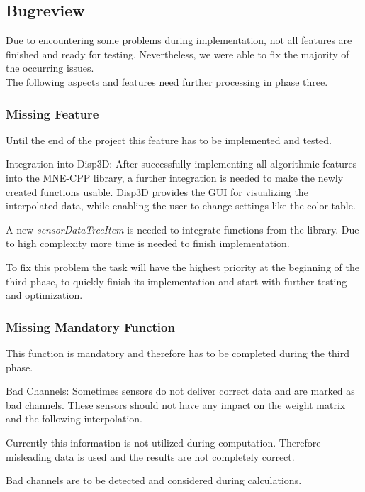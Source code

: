\subsection{Bugreview} \label{bugreview}
Due to encountering some problems during implementation, not all features are finished and ready for testing.
Nevertheless, we were able to fix the majority of the occurring issues. \\ 
The following aspects and features need further processing in phase three. 

\subsubsection{Missing Feature}
Until the end of the project this feature has to be implemented and tested.

\begin{aims}
	\item[\hspace*{11mm} Integration into Disp3D:] After successfully implementing all algorithmic features into the MNE-CPP library, a further integration is needed to make the newly created functions usable. Disp3D provides the GUI for visualizing the interpolated data, while enabling the user to change settings like the color table.
	
	A new \textit{sensorDataTreeItem} is needed to integrate functions from the library. Due to high complexity more time is needed to finish implementation.
	
	To fix this problem the task will have the highest priority at the beginning of the third phase, to quickly finish its implementation and start with further testing and optimization. 
	
	
\end{aims}

\subsubsection{Missing Mandatory Function} \label{badChannel}
This function is mandatory and therefore has to be completed during the third phase. 

\begin{aims}
	\item[\hspace*{11mm} Bad Channels:]Sometimes sensors do not deliver correct data and are marked as bad channels. These sensors should not have                          					   any impact on the weight matrix and the following interpolation. 
	
					   Currently this information is not utilized during computation. Therefore misleading data is used and the 							   results are not completely correct.  
					  
					   Bad channels are to be detected and considered during calculations. 
\end{aims}

